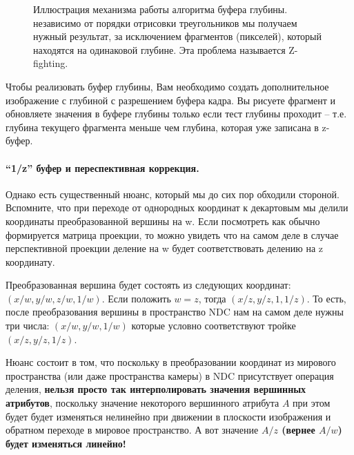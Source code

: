 \documentclass[12pt,subf,href,colorlinks=true]{article}
\begin{document}
\begin{figure}[h]
	\caption{Иллюстрация механизма работы алгоритма буфера глубины. независимо от порядки отрисовки треугольников мы получаем нужный результат, за исключением фрагментов (пикселей), который находятся на одинаковой глубине. Эта проблема называется Z-fighting.}
	\label{fig:zbuffer}
\end{figure}

Чтобы реализовать буфер глубины, Вам необходимо создать дополнительное изображение с глубиной с разрешением буфера кадра. Вы рисуете фрагмент и обновляете значения в буфере глубины только если тест глубины проходит -- т.е. глубина текущего фрагмента меньше чем глубина, которая уже записана в z-буфер.

\paragraph{``1/z'' буфер и переспективная коррекция.} Однако есть существенный нюанс, который мы до сих пор обходили стороной. Вспомните, что при переходе от однородных координат к декартовым мы делили координаты преобразованной вершины на w. Если посмотреть как обычно формируется матрица проекции, то можно увидеть что на самом деле в случае перспективной проекции деление на w будет соответствовать делению на z координату. 

Преобразованная вершина будет состоять из следующих координат: $(x/w, y/w, z/w, 1/w)$. Если положить $w=z$, тогда $(x/z, y/z, 1, 1/z)$. То есть, после преобразования вершины в пространство NDC нам на самом деле нужны три числа: $(x/w, y/w, 1/w)$ которые условно соответствуют тройке $(x/z, y/z, 1/z)$.

Нюанс состоит в том, что поскольку в преобразовании координат из мирового пространства (или даже пространства камеры) в NDC присутствует операция деления, \textbf{нельзя просто так интерполировать значения вершинных атрибутов}, поскольку значение некоторого вершинного атрибута $A$ при этом будет будет изменяться нелинейно при движении в плоскости изображения и обратном переходе в мировое пространство. А вот значение \textbf{$A/z$ (вернее $A/w$) будет изменяться линейно!} 
\end{document}
